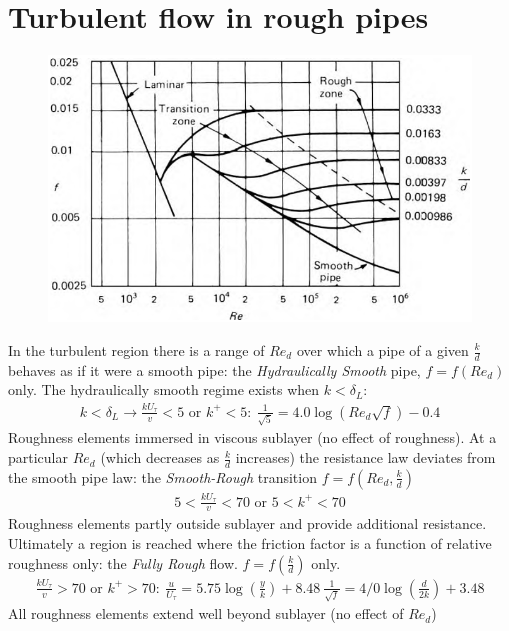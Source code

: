 \documentclass[class=report, crop=false, 12pt,a4paper]{standalone}
\begin{document}
\section{Turbulent flow in rough pipes}
\begin{figure}[H]
  \centering
  \includegraphics[width = 0.7 \textwidth]{../img/diagram86.png}
  \caption{}
\end{figure}
In the turbulent region there is a range of $Re_d$ over which a pipe of a given $\frac{k}{d}$ behaves as if it were a smooth pipe: the \textit{Hydraulically Smooth} pipe, $f = f\left(Re_d\right)$ only. The hydraulically smooth regime exists when $k < \delta_L$:
\begin{align}
  k < \delta_L \rightarrow \frac{k U_{\tau}}{v} < 5 \textrm{ or } k^+ < 5: \ \frac{1}{\sqrt{5}} = 4.0 \log \left(Re_d \sqrt{f}\right) - 0.4
\end{align}
Roughness elements immersed in viscous sublayer (no effect of roughness). At a particular $Re_d$ (which decreases as $\frac{k}{d}$ increases) the resistance law deviates from the smooth pipe law: the \textit{Smooth-Rough} transition $f = f\left(Re_d, \frac{k}{d}\right)$
\begin{align}
  5 < \frac{k U_{\tau}}{v} < 70 \textrm{ or } 5 < k^+ < 70
\end{align}
Roughness elements partly outside sublayer and provide additional resistance. Ultimately a region is reached where the friction factor is a function of relative roughness only: the \textit{Fully Rough} flow. $f = f\left(\frac{k}{d}\right)$ only.
\begin{align}
  \frac{kU_{\tau}}{v} > 70\textrm{ or } k^+ > 70: \ \frac{u}{U_\tau} = 5.75 \log \left(\frac{y}{k}\right) + 8.48 \ \frac{1}{\sqrt{f}} = 4/0\log \left(\frac{d}{2k}\right) +3.48
\end{align}
All roughness elements extend well beyond sublayer (no effect of $Re_d$)
\end{document}
